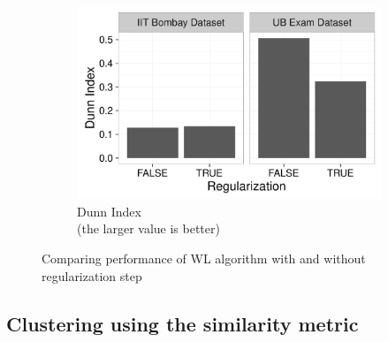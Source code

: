 \begin{figure}[h!]
\begin{subfigure}[b]{0.3\textwidth}
    \end{subfigure}
    ~
    \begin{subfigure}[b]{0.3\textwidth}
        \centering
        \includegraphics[width=\textwidth]{graphics/dunn4}
        \caption{Dunn Index\\(the larger value is better)}
    \end{subfigure}
    \caption{Comparing performance of WL algorithm with and without regularization step}
    \label{fig:comparison4}
\end{figure}

\subsection{Clustering using the similarity metric} 


